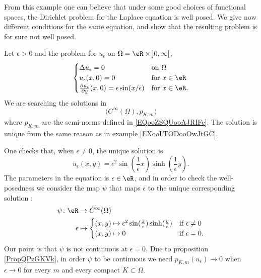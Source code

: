 From this example one can believe that under some good choices of functional spaces, the Dirichlet problem for the Laplace equation is well posed. We give now different conditions for the same equation, and show that the resulting problem is for sure not well posed.

\begin{example}
Let \( \epsilon>0\) and the problem for \( u_{\epsilon}\) on \( \Omega=\eR\times \mathopen] 0 , \infty \mathclose[\),
    \begin{equation}        \label{EQooUBUEooMCDIlZ}
         \begin{cases}
             \Delta u_{\epsilon}=0    &   \text{on } \Omega\\
             u_{\epsilon}(x,0)=0    &    \text{for } x\in \eR \\
             \frac{ \partial u_{\epsilon} }{ \partial y }(x,0)=\epsilon\sin(x/\epsilon)    &    \text{for }x\in \eR.  
         \end{cases}
     \end{equation}
     We are searching the solutions in 
     \begin{equation}
         \big(  C^{\infty}(\Omega),p_{K,m} \big)
     \end{equation}
     where \( p_{K,m}\) are the semi-norms defined in \eqref{EQooZSQUooAJRIFe}. The solution is unique from the same reason as in example \ref{EXooLTODooOwJtGC}.

     One checks that, when \( \epsilon\neq 0\), the unique solution is
     \begin{equation}
         u_{\epsilon}(x,y)=\epsilon^2\sin(\frac{1}{ \epsilon }x)\sinh(\frac{1}{ \epsilon }y).
     \end{equation}
     The parameters in the equation is \( \epsilon\in \eR\), and in order to check the well-posedness we consider the map \( \psi\) that maps \( \epsilon\) to the unique corresponding solution :
     \begin{equation}
         \begin{aligned}
             \psi\colon \eR&\to  C^{\infty}(\Omega) \\
             \epsilon&\mapsto \begin{cases}
                 (x,y)\mapsto \epsilon^2\sin(\frac{ x }{ \epsilon })\sinh(\frac{ y }{ \epsilon })   &   \text{if } \epsilon\neq 0\\
                 (x,y)\mapsto 0 &    \text{if } \epsilon=0.
             \end{cases}
         \end{aligned}
     \end{equation}
     Our point is that \( \psi\) is not continuous at \( \epsilon=0\). Due to proposition \ref{PropQPzGKVk}, in order \( \psi\) to be continuous we need \( p_{K,m}(u_{\epsilon})\to 0\) when \( \epsilon\to 0\) for every \( m\) and every compact \( K\subset \Omega\).


\end{example}
